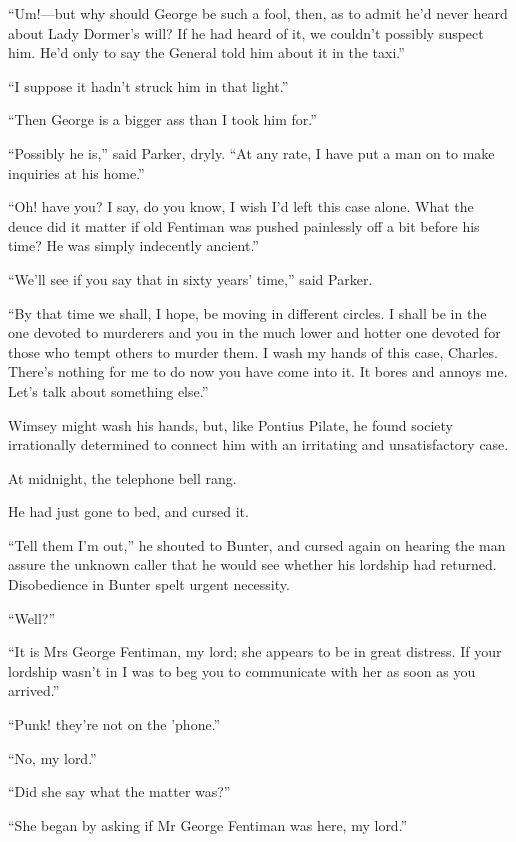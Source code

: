 \enquote{Um!---but why should George be such a fool, then, as to admit he'd never heard about Lady Dormer's will? If he had heard of it, we couldn't possibly suspect him. He'd only to say the General told him about it in the taxi.}

\enquote{I suppose it hadn't struck him in that light.}

\enquote{Then George is a bigger ass than I took him for.}

\enquote{Possibly he is,} said Parker, dryly. \enquote{At any rate, I have put a man on to make inquiries at his home.}

\enquote{Oh! have you? I say, do you know, I wish I'd left this case alone. What the deuce did it matter if old Fentiman was pushed painlessly off a bit before his time? He was simply indecently ancient.}

\enquote{We'll see if you say that in sixty years' time,} said Parker.

\enquote{By that time we shall, I hope, be moving in different circles. I shall be in the one devoted to murderers and you in the much lower and hotter one devoted for those who tempt others to murder them. I wash my hands of this case, Charles. There's nothing for me to do now you have come into it. It bores and annoys me. Let's talk about something else.}

Wimsey might wash his hands, but, like Pontius Pilate, he found society irrationally determined to connect him with an irritating and unsatisfactory case.

At midnight, the telephone bell rang.

He had just gone to bed, and cursed it.

\enquote{Tell them I'm out,} he shouted to Bunter, and cursed again on hearing the man assure the unknown caller that he would see whether his lordship had returned. Disobedience in Bunter spelt urgent necessity.

\enquote{Well?}

\enquote{It is Mrs George Fentiman, my lord; she appears to be in great distress. If your lordship wasn't in I was to beg you to communicate with her as soon as you arrived.}

\enquote{Punk! they're not on the 'phone.}

\enquote{No, my lord.}

\enquote{Did she say what the matter was?}

\enquote{She began by asking if Mr George Fentiman was here, my lord.}

